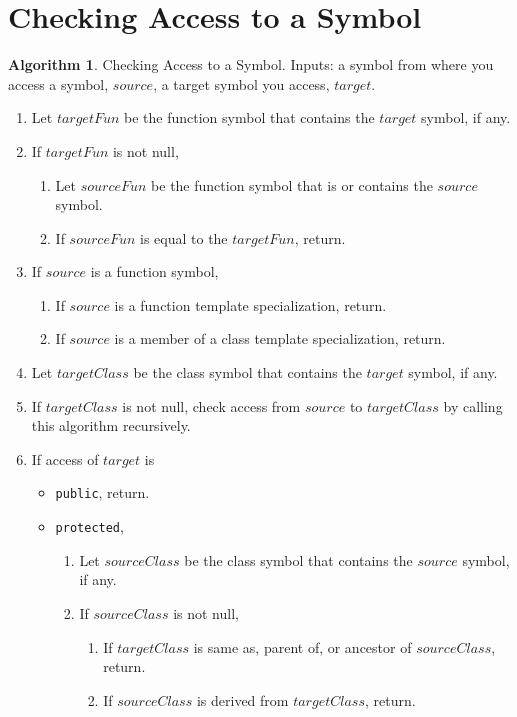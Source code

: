 \documentclass[a4paper,oneside,11pt]{book}
\theoremstyle{definition}
\newtheorem{algo}{Algorithm}[section]
\begin{document}
\section{Checking Access to a Symbol}

\begin{algo}\label{checkaccesstosymbol} Checking Access to a Symbol.
Inputs: a symbol from where you access a symbol, $source$, a target symbol you access, $target$.
\begin{enumerate}
\item
Let $targetFun$ be the function symbol that contains the $target$ symbol, if any.
\item
If $targetFun$ is not null,
\begin{enumerate}
\item
Let $sourceFun$ be the function symbol that is or contains the $source$ symbol.
\item
If $sourceFun$ is equal to the $targetFun$, return.
\end{enumerate}
\item
If $source$ is a function symbol,
\begin{enumerate}
\item
If $source$ is a function template specialization, return.
\item
If $source$ is a member of a class template specialization, return.
\end{enumerate}
\item
Let $targetClass$ be the class symbol that contains the $target$ symbol, if any.
\item
If $targetClass$ is not null, check access from $source$ to $targetClass$ by calling this algorithm recursively.
\item
If access of $target$ is
\begin{itemize}
\item
\verb|public|, return.
\item
\verb|protected|,
\begin{enumerate}
\item
Let $sourceClass$ be the class symbol that contains the $source$ symbol, if any.
\item
If $sourceClass$ is not null,
\begin{enumerate}
\item
If $targetClass$ is same as, parent of, or ancestor of $sourceClass$, return.
\item
If $sourceClass$ is derived from $targetClass$, return.
\end{enumerate}

\end{enumerate}
\end{itemize}
\end{enumerate}
\end{algo}
\end{document}
